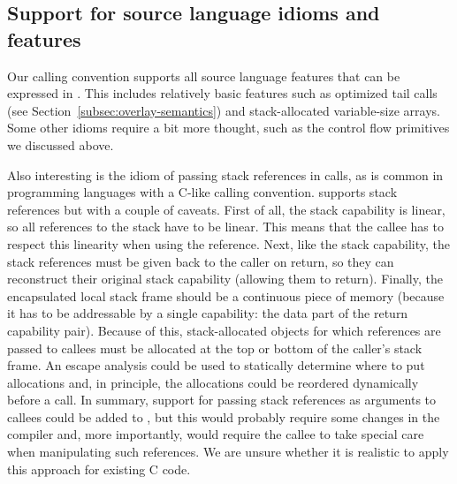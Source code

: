 \subsection{Support for source language idioms and features}
\label{sec:supp-source-lang}

\begin{jversion}
  Our calling convention supports all source language features that can be expressed in \srccm{}.
  This includes relatively basic features such as optimized tail calls (see Section~\ref{subsec:overlay-semantics}) and stack-allocated variable-size arrays.
  Some other idioms require a bit more thought, such as the control flow primitives we discussed above.
  
  Also interesting is the idiom of passing stack references in calls, as is common in programming languages with a C-like calling convention.
  \stktokens{} supports stack references but with a couple of caveats.
  First of all, the stack capability is linear, so all references to the stack have to be linear.
  This means that the callee has to respect this linearity when using the reference.
  Next, like the stack capability, the stack references must be given back to the caller on return, so they can reconstruct their original stack capability (allowing them to return). 
  Finally, the encapsulated local stack frame should be a continuous piece of memory (because it has to be addressable by a single capability: the data part of the return capability pair).
  Because of this, stack-allocated objects for which references are passed to callees must be allocated at the top or bottom of the caller's stack frame.
  An escape analysis could be used to statically determine where to put allocations and, in principle, the allocations could be reordered dynamically before a call.
  In summary, support for passing stack references as arguments to callees could be added to \stktokens{}, but this would probably require some changes in the compiler and, more importantly, would require the callee to take special care when manipulating such references.
  We are unsure whether it is realistic to apply this approach for existing C code.


\end{jversion}
